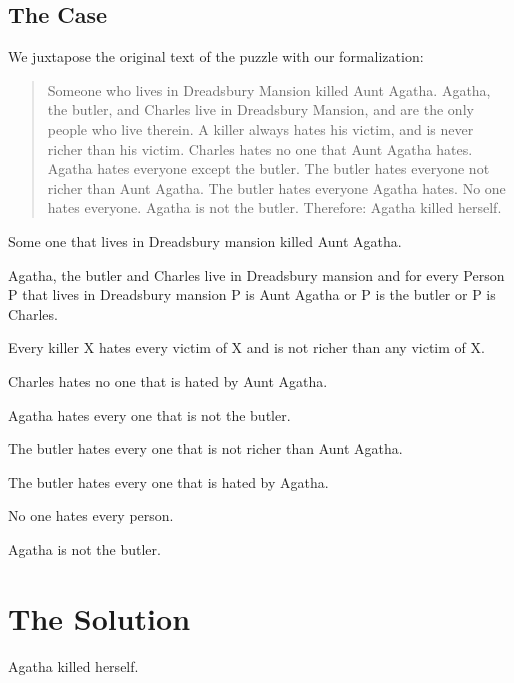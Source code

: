 \documentclass{article}
\begin{document}
\subsection{The Case}

We juxtapose the original text of the puzzle with our formalization:

\begin{quotation}
Someone who lives in Dreadsbury Mansion killed Aunt Agatha.
Agatha, the butler, and Charles live in Dreadsbury Mansion, and are the only
people who live therein. A killer always hates his victim, and is never richer than
his victim. Charles hates no one that Aunt Agatha hates. Agatha hates everyone
except the butler. The butler hates everyone not richer than Aunt Agatha. The
butler hates everyone Agatha hates. No one hates everyone. Agatha is not the
butler. Therefore: Agatha killed herself.
\end{quotation}


\begin{forthel}

\begin{axiom}
Some one that lives in Dreadsbury mansion killed Aunt Agatha.
\end{axiom}

\begin{axiom}
Agatha, the butler and Charles live in Dreadsbury mansion and
for every Person P that lives in Dreadsbury mansion P is Aunt Agatha
or P is the butler or P is Charles.
\end{axiom}

\begin{axiom}
Every killer X hates every victim of X and is not richer than any victim of X.
\end{axiom}

\begin{axiom}
Charles hates no one that is hated by Aunt Agatha.
\end{axiom}

\begin{axiom}
Agatha hates every one that is not the butler.
\end{axiom}

\begin{axiom}
The butler hates every one that is not richer than Aunt Agatha.
\end{axiom}

\begin{axiom}
The butler hates every one that is hated by Agatha.
\end{axiom}

\begin{axiom}
No one hates every person.
\end{axiom}

\begin{axiom}
Agatha is not the butler.
\end{axiom}

\end{forthel}


\section{The Solution}

\begin{forthel}

\begin{theorem}
Agatha killed herself.
\end{theorem}

\end{forthel}
\end{document}

